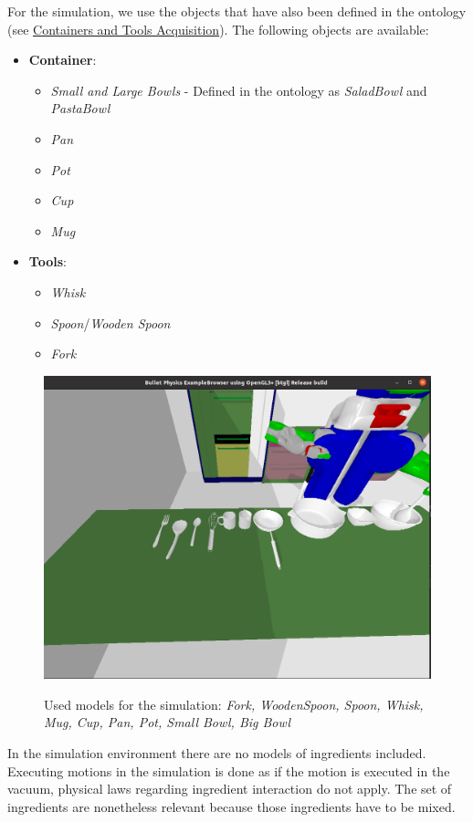 For the simulation, we use the objects that have also been defined in the ontology (see \hyperref[sec:ContainersAndToolsAcquisition]{Containers and Tools Acquisition}).
The following objects are available:
\begin{itemize}
	\item \textbf{Container}: 
        \begin{itemize} 
            \item \textit{Small and Large Bowls} - Defined in the ontology as \textit{SaladBowl} and \textit{PastaBowl}
            \item \textit{Pan}
            \item \textit{Pot}
            \item \textit{Cup}
            \item \textit{Mug}
        \end{itemize}
	\item \textbf{Tools}: 
        \begin{itemize}
            \item \textit{Whisk}
            \item \textit{Spoon}/\textit{Wooden Spoon}
            \item \textit{Fork}
        \end{itemize}
\end{itemize}

\begin{figure}[H]
    \centering
    \includegraphics[scale=0.28]{Graphics/toolscontainersmodels.png}
    \label{fig:toolscontainersmodels}
    \caption{Used models for the simulation: \textit{Fork, WoodenSpoon, Spoon, Whisk, Mug, Cup, Pan, Pot, Small Bowl, Big Bowl}}
\end{figure}
In the simulation environment there are no models of ingredients included. Executing motions in the simulation is done as if the motion is executed in 
the vacuum, physical laws regarding ingredient interaction do not apply. The set of ingredients are nonetheless relevant because those ingredients have to be mixed.

